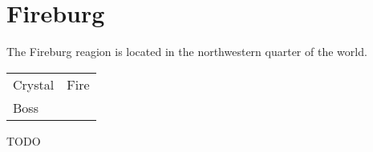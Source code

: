 \section{Fireburg}

The Fireburg reagion is located in the northwestern quarter of the world.

\noindent\begin{tabularx}{\textwidth}[l]{lX}
	Crystal & Fire \\
	Boss & \nameref{monster:dualhead_hydra}
\end{tabularx}











TODO
